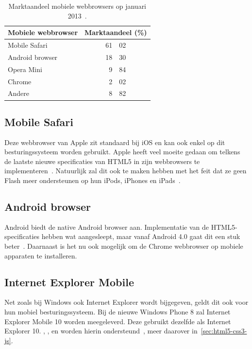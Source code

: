 \begin{table}
\centering
\begin{tabular}[b]{l r@{,}l}
\toprule
\textbf{Mobiele webbrowser} & \multicolumn{2}{c}{\textbf{Marktaandeel (\%)}} \\
\midrule
Mobile Safari		& 61 	& 02	 	\\
Android browser		& 18 	& 30 	\\
Opera Mini			& 9 		& 84 	\\
Chrome				& 2		& 02 	\\
Andere				& 8		& 82		\\
\bottomrule
\end{tabular}
\caption{Marktaandeel mobiele webbrowsers op januari 2013~\cite{NetApplications2012}.}
\label{tbl:marktaandeel-browsers}
\end{table}

\subsection{Mobile Safari}
\label{sec:mobile-safari}
Deze webbrowser van Apple zit standaard bij iOS en kan ook enkel op dit besturingssysteem worden gebruikt. 
Apple heeft veel moeite gedaan om telkens de laatste nieuwe specificaties van HTML5 in zijn webbrowsers te implementeren~\cite{Hales2012}. 
Natuurlijk zal dit ook te maken hebben met het feit dat ze geen Flash meer ondersteunen op hun iPods, iPhones en iPads~\cite{Jobs2010}.

\subsection{Android browser}
\label{sec:android-browser}
Android biedt de native Android browser aan. 
Implementatie van de HTML5-specificaties hebben wat aangesleept, maar vanaf Android 4.0 gaat dit een stuk beter~\cite{Hales2012}. 
Daarnaast is het nu ook mogelijk om de Chrome webbrowser op mobiele apparaten te installeren.

\subsection{Internet Explorer Mobile}
Net zoals bij Windows ook Internet Explorer wordt bijgegeven, geldt dit ook voor hun mobiel  besturingssysteem. 
Bij de nieuwe Windows Phone 8 zal Internet Explorer Mobile 10 worden meegeleverd. 
Deze gebruikt dezelfde  als Internet Explorer 10. , ,  en  worden hierin ondersteund~\cite{Hales2012}, meer daarover in~\ref{sec:html5-css3-js}.

